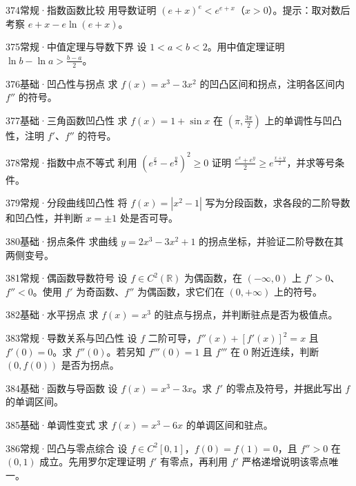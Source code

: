 \begin{exercise}{374}{常规·指数函数比较}
用导数证明 $(e+x)^e<e^{e+x}$（$x>0$）。提示：取对数后考察 $e+x-e\ln(e+x)$。
\end{exercise}
\begin{exercise}{375}{常规·中值定理与导数下界}
设 $1<a<b<2$。用中值定理证明 $\ln b-\ln a>\frac{b-a}{2}$。
\end{exercise}
\begin{exercise}{376}{基础·凹凸性与拐点}
求 $f(x)=x^3-3x^2$ 的凹凸区间和拐点，注明各区间内 $f''$ 的符号。
\end{exercise}
\begin{exercise}{377}{基础·三角函数凹凸性}
求 $f(x)=1+\sin x$ 在 $(\pi,\frac{3\pi}{2})$ 上的单调性与凹凸性，注明 $f'$、$f''$ 的符号。
\end{exercise}
\begin{exercise}{378}{常规·指数中点不等式}
利用 $(e^{\frac{x}{2}}-e^{\frac{y}{2}})^2\ge0$ 证明 $\frac{e^x+e^y}{2}\ge e^{\frac{x+y}{2}}$，并求等号条件。
\end{exercise}
\begin{exercise}{379}{常规·分段曲线凹凸性}
将 $f(x)=|x^2-1|$ 写为分段函数，求各段的二阶导数和凹凸性，并判断 $x=\pm1$ 处是否可导。
\end{exercise}
\begin{exercise}{380}{基础·拐点条件}
求曲线 $y=2x^3-3x^2+1$ 的拐点坐标，并验证二阶导数在其两侧变号。
\end{exercise}
\begin{exercise}{381}{常规·偶函数导数符号}
设 $f\in C^2(\mathbb R)$ 为偶函数，在 $(-\infty,0)$ 上 $f'>0$、$f''<0$。使用 $f'$ 为奇函数、$f''$ 为偶函数，求它们在 $(0,+\infty)$ 上的符号。
\end{exercise}
\begin{exercise}{382}{基础·水平拐点}
求 $f(x)=x^3$ 的驻点与拐点，并判断驻点是否为极值点。
\end{exercise}
\begin{exercise}{383}{常规·导数关系与凹凸性}
设 $f$ 二阶可导，$f''(x)+[f'(x)]^2=x$ 且 $f'(0)=0$。求 $f''(0)$。若另知 $f'''(0)=1$ 且 $f'''$ 在 $0$ 附近连续，判断 $(0,f(0))$ 是否为拐点。
\end{exercise}
\begin{exercise}{384}{基础·函数与导函数}
设 $f(x)=x^3-3x$。求 $f'$ 的零点及符号，并据此写出 $f$ 的单调区间。
\end{exercise}
\begin{exercise}{385}{基础·单调性变式}
求 $f(x)=x^3-6x$ 的单调区间和驻点。
\end{exercise}
\begin{exercise}{386}{常规·凹凸与零点综合}
设 $f\in C^2[0,1]$，$f(0)=f(1)=0$，且 $f''>0$ 在 $(0,1)$ 成立。先用罗尔定理证明 $f'$ 有零点，再利用 $f'$ 严格递增说明该零点唯一。
\end{exercise}
